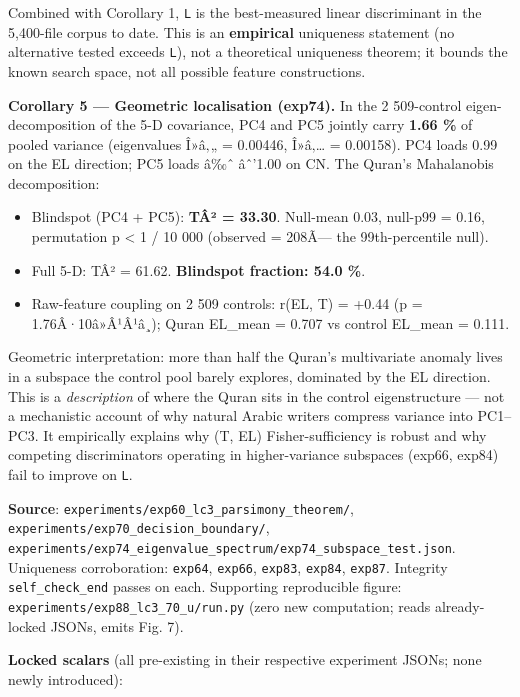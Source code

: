 \documentclass[
]{article}
\newcounter{none} %
\providecommand{\tightlist}{%
  \setlength{\itemsep}{0pt}\setlength{\parskip}{0pt}}
\begin{document}
Combined with Corollary 1, \texttt{L} is the best-measured linear
discriminant in the 5,400-file corpus to date. This is an
\textbf{empirical} uniqueness statement (no alternative tested exceeds
\texttt{L}), not a theoretical uniqueness theorem; it bounds the known
search space, not all possible feature constructions.

\textbf{Corollary 5 --- Geometric localisation (exp74).} In the 2
509-control eigen-decomposition of the 5-D covariance, PC4 and PC5
jointly carry \textbf{1.66 \%} of pooled variance (eigenvalues Î»â‚„ =
0.00446, Î»â‚\ldots{} = 0.00158). PC4 loads 0.99 on the EL direction;
PC5 loads â‰ˆ âˆ'1.00 on CN. The Quran's Mahalanobis decomposition:

\begin{itemize}
\tightlist
\item
  Blindspot (PC4 + PC5): \textbf{TÂ² = 33.30}. Null-mean 0.03, null-p99
  = 0.16, permutation p \textless{} 1 / 10 000 (observed = 208Ã--- the
  99th-percentile null).
\item
  Full 5-D: TÂ² = 61.62. \textbf{Blindspot fraction: 54.0 \%}.
\item
  Raw-feature coupling on 2 509 controls: r(EL, T) = +0.44 (p =
  1.76Â·10â»Â¹Â¹â¸); Quran EL\_mean = 0.707 vs control EL\_mean = 0.111.
\end{itemize}

Geometric interpretation: more than half the Quran's multivariate
anomaly lives in a subspace the control pool barely explores, dominated
by the EL direction. This is a \emph{description} of where the Quran
sits in the control eigenstructure --- not a mechanistic account of why
natural Arabic writers compress variance into PC1--PC3. It empirically
explains why (T, EL) Fisher-sufficiency is robust and why competing
discriminators operating in higher-variance subspaces (exp66, exp84)
fail to improve on \texttt{L}.

\textbf{Source}: \texttt{experiments/exp60\_lc3\_parsimony\_theorem/},
\texttt{experiments/exp70\_decision\_boundary/},
\texttt{experiments/exp74\_eigenvalue\_spectrum/exp74\_subspace\_test.json}.
Uniqueness corroboration: \texttt{exp64}, \texttt{exp66},
\texttt{exp83}, \texttt{exp84}, \texttt{exp87}. Integrity
\texttt{self\_check\_end} passes on each. Supporting reproducible
figure: \texttt{experiments/exp88\_lc3\_70\_u/run.py} (zero new
computation; reads already-locked JSONs, emits Fig. 7).

\textbf{Locked scalars} (all pre-existing in their respective experiment
JSONs; none newly introduced):
\end{document}
